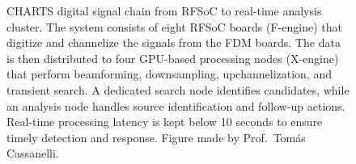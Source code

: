 \begin{figure}[t]
    \caption[CHARTS digital signal chain from RFSoC to real-time analysis cluster]{CHARTS digital signal chain from RFSoC to real-time analysis cluster. The system consists of eight RFSoC boards (F-engine) that digitize and channelize the signals from the FDM boards. The data is then distributed to four GPU-based processing nodes (X-engine) that perform beamforming, downsampling, upchannelization, and transient search. A dedicated search node identifies candidates, while an analysis node handles source identification and follow-up actions. Real-time processing latency is kept below 10 seconds to ensure timely detection and response. Figure made by Prof.\ Tomás Cassanelli.}
    \label{fig:charts_signal_chain}
  \end{figure}




